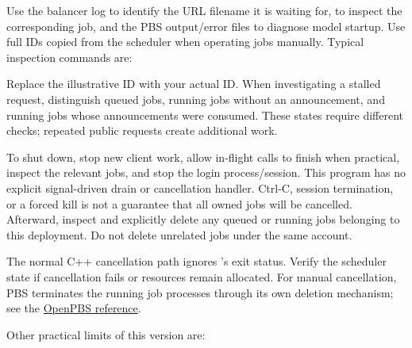\documentclass[
  11pt,
  a4paper,
]{article}
\newenvironment{Shaded}{}{}
\newcommand{\AttributeTok}[1]{\textcolor[rgb]{0.49,0.56,0.16}{#1}}
\newcommand{\ExtensionTok}[1]{#1}
\newcommand{\NormalTok}[1]{#1}
\newcommand{\StringTok}[1]{\textcolor[rgb]{0.25,0.44,0.63}{#1}}
\newcommand{\VariableTok}[1]{\textcolor[rgb]{0.10,0.09,0.49}{#1}}
\DeclareRobustCommand{\InlineCode}[1]{{\ttfamily\upshape\seqsplit{#1}}}
\renewenvironment{Shaded}{\begin{snugshade}}{\end{snugshade}}
\begin{document}
Use the balancer log to identify the URL filename it is waiting for,
\InlineCode{qstat} to inspect the corresponding job, and the PBS
output/error files to diagnose model startup. Use full IDs copied from
the scheduler when operating jobs manually. Typical inspection commands
are:


\begin{Shaded}
\end{Shaded}

Replace the illustrative ID with your actual ID. When investigating a
stalled request, distinguish queued jobs, running jobs without an
announcement, and running jobs whose announcements were consumed. These
states require different checks; repeated public \InlineCode{/ModelInfo}
requests create additional work.

To shut down, stop new client work, allow in-flight calls to finish when
practical, inspect the relevant jobs, and stop the login
process/session. This program has no explicit signal-driven drain or
cancellation handler. Ctrl-C, session termination, or a forced kill is
not a guarantee that all owned jobs will be cancelled. Afterward,
inspect \InlineCode{qstat} and explicitly delete any queued or running
jobs belonging to this deployment. Do not delete unrelated jobs under
the same account.

The normal C++ cancellation path ignores \InlineCode{qdel}'s exit
status. Verify the scheduler state if cancellation fails or resources
remain allocated. For manual cancellation, PBS terminates the running
job processes through its own deletion mechanism; see the
\href{https://github.com/openpbs/openpbs/blob/master/doc/man1/qdel.1B}{OpenPBS
\InlineCode{qdel} reference}.

Other practical limits of this version are:
\end{document}
